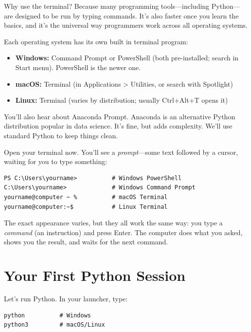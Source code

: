 Why use the terminal? Because many programming tools---including Python---are designed to be run by typing commands. It's also faster once you learn the basics, and it's the universal way programmers work across all operating systems.

Each operating system has its own built in terminal program:

\begin{itemize}
    \item \textbf{Windows:} Command Prompt or PowerShell (both pre-installed; search in Start menu). PowerShell is the newer one.
    \item \textbf{macOS:} Terminal (in Applications > Utilities, or search with Spotlight)
    \item \textbf{Linux:} Terminal (varies by distribution; usually Ctrl+Alt+T opens it)
\end{itemize}

You'll also hear about Anaconda Prompt. Anaconda is an alternative Python distribution popular in data science. It's fine, but adds complexity. We'll use standard Python to keep things clean.

Open your terminal now. You'll see a \emph{prompt}---some text followed by a cursor, waiting for you to type something:

\begin{lstlisting}[style=shellstyle]
PS C:\Users\yourname>          # Windows PowerShell
C:\Users\yourname>             # Windows Command Prompt
yourname@computer ~ %          # macOS Terminal
yourname@computer:~$           # Linux Terminal
\end{lstlisting}

The exact appearance varies, but they all work the same way: you type a \emph{command} (an instruction) and press Enter. The computer does what you asked, shows you the result, and waits for the next command.

\section{Your First Python Session}
\label{sec:first-repl}

Let's run Python. In your launcher, type:

\begin{lstlisting}[style=shellstyle]
python          # Windows
python3         # macOS/Linux
\end{lstlisting}

